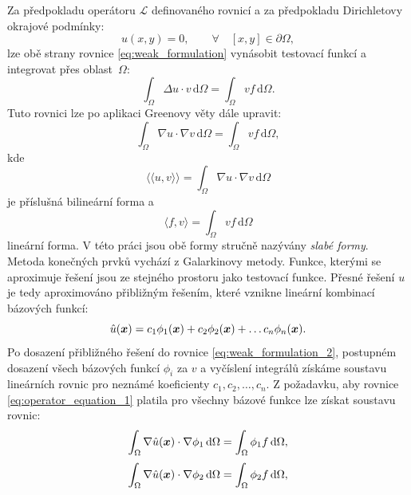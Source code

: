 \documentclass[12pt,a4paper,oneside]{article}
\numberwithin{equation}{section} %
\numberwithin{figure}{section} %
\numberwithin{table}{section} %
\newcommand{\dif}{\,\mathrm{d}} %
\renewcommand{\vec}[1]{\mbox{\boldmath$#1$}} %
\begin{document}
Za předpokladu operátoru $\mathcal{L}$ definovaného rovnicí a za předpokladu Dirichletovy okrajové podmínky:
\begin{equation}
u(x,y) = 0, \qquad \forall \quad [x, y] \in \partial\Omega,  
\label{eq:operator_equation_1}
\end{equation}
lze obě strany rovnice \ref{eq:weak_formulation} vynásobit testovací funkcí a integrovat přes oblast~$\Omega$:
\begin{equation}
\int_\Omega \Delta u \cdot v \dif \Omega =  
\int_\Omega v f \dif \Omega.
\label{eq:weak_formulation_1}
\end{equation}
Tuto rovnici lze po aplikaci Greenovy věty dále upravit:
\begin{equation}
\int_\Omega \nabla u \cdot \nabla v \dif \Omega = \int_\Omega v f \dif \Omega,
\label{eq:weak_formulation_2}
\end{equation} 
kde 
\begin{equation}
\langle\langle u, v \rangle\rangle = \int_\Omega \nabla u \cdot \nabla v \dif \Omega
\end{equation}
je příslušná bilineární forma a  
\begin{equation}
\langle f,v \rangle = \int_\Omega v f \dif \Omega
\end{equation}
lineární forma. V této práci jsou obě formy stručně nazývány \emph{slabé formy}.
Metoda konečných prvků vychází z Galarkinovy metody. Funkce, kterými se aproximuje řešení jsou ze stejného prostoru jako testovací funkce. 
Přesné řešení $u$ je tedy aproximováno přibližným řešením, které vznikne lineární kombinací bázových funkcí:
\begin{equation}
\hat{u}(\vec{x}) = c_1 \phi_1(\vec{x}) + c_2 \phi_2(\vec{x}) +  \dots c_n \phi_n(\vec{x}).
\end{equation}
Po dosazení přibližného řešení do rovnice \ref{eq:weak_formulation_2},  postupném dosazení všech bázových funkcí $\phi_i$ za $v$ a  vyčíslení integrálů získáme soustavu lineárních rovnic pro neznámé koeficienty 
$c_1, c_2, \dots , c_n$. 
Z požadavku, aby rovnice \ref{eq:operator_equation_1} platila pro všechny bázové funkce lze získat soustavu rovnic:
\begin{equation}
\int_\Omega \nabla \hat{u}(\vec{x}) \cdot \nabla \phi_1 \dif \Omega = \int_\Omega \phi_1 f \dif \Omega,
\end{equation}
\begin{displaymath}
\int_\Omega \nabla \hat{u}(\vec{x}) \cdot \nabla \phi_2 \dif \Omega = \int_\Omega \phi_2 f \dif \Omega,
\end{displaymath}
\end{document}
